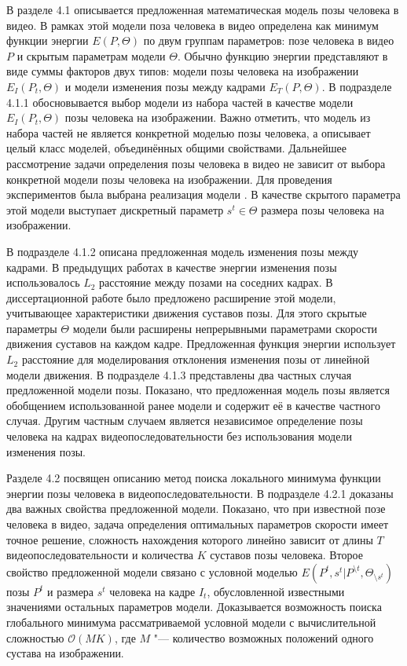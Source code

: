 В разделе 4.1 описывается предложенная математическая модель позы человека в видео. В рамках этой модели поза человека в видео определена как минимум функции энергии $E(P, \Theta)$ по двум группам параметров: позе человека в видео $P$ и скрытым параметрам модели $\Theta$. Обычно функцию энергии представляют в виде суммы факторов двух типов: модели позы человека на изображении $E_I(P_t, \Theta)$ и модели изменения позы между кадрами $E_T(P, \Theta)$. В подразделе 4.1.1 обосновывается выбор модели из набора частей в качестве модели $E_I(P_t, \Theta)$ позы человека на изображении. Важно отметить, что модель из набора частей не является конкретной моделью позы человека, а описывает целый класс моделей, объединённых общими свойствами. Дальнейшее рассмотрение задачи определения позы человека в видео не зависит от выбора конкретной модели позы человека на изображении. Для проведения экспериментов была выбрана реализация модели \cite{park2011n}. В качестве скрытого параметра этой модели выступает дискретный параметр $s^t \in \Theta$ размера позы человека на изображении.

В подразделе 4.1.2 описана предложенная модель изменения позы между кадрами. В предыдущих работах в качестве энергии изменения позы использовалось $L_2$ расстояние между позами на соседних кадрах. В диссертационной работе было предложено расширение этой модели, учитывающее характеристики движения суставов позы. Для этого скрытые параметры $\Theta$ модели были расширены непрерывными параметрами скорости движения суставов на каждом кадре. Предложенная функция энергии использует $L_2$ расстояние для моделирования отклонения изменения позы от линейной модели движения. В подразделе 4.1.3 представлены два частных случая предложенной модели позы. Показано, что предложенная модель позы является обобщением использованной ранее модели и содержит её в качестве частного случая. Другим частным случаем является независимое определение позы человека на кадрах видеопоследовательности без использования модели изменения позы.

Разделе 4.2 посвящен описанию метод поиска локального минимума функции энергии позы человека в видеопоследовательности. В подразделе 4.2.1 доказаны два важных свойства предложенной модели. Показано, что при известной позе человека в видео, задача определения оптимальных параметров скорости имеет точное решение, сложность нахождения которого линейно зависит от длины $T$ видеопоследовательности и количества $K$ суставов позы человека. Второе свойство предложенной модели связано с условной моделью $E(P^t, s^t | P^{\setminus t}, \Theta_{\setminus s^t})$ позы $P^t$ и размера $s^t$ человека на кадре $I_t$, обусловленной известными значениями остальных параметров модели. Доказывается возможность поиска глобального минимума рассматриваемой условной модели с вычислительной сложностью $\mathcal{O}(MK)$, где $M$ "--- количество возможных положений одного сустава на изображении.

